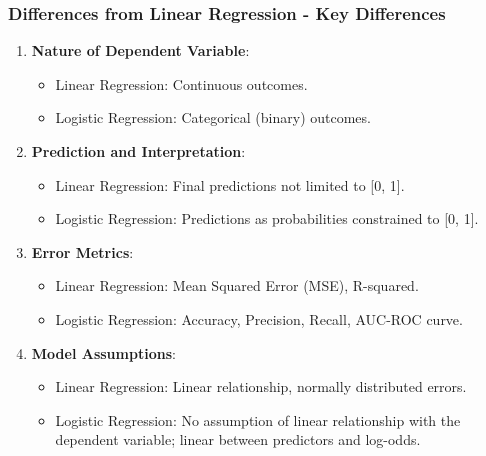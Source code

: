 \documentclass[aspectratio=169]{beamer}
\begin{document}
\begin{frame}[fragile]
    \frametitle{Differences from Linear Regression - Key Differences}
    
    \begin{enumerate}
        \item \textbf{Nature of Dependent Variable}:
            \begin{itemize}
                \item Linear Regression: Continuous outcomes.
                \item Logistic Regression: Categorical (binary) outcomes.
            \end{itemize}

        \item \textbf{Prediction and Interpretation}:
            \begin{itemize}
                \item Linear Regression: Final predictions not limited to [0, 1].
                \item Logistic Regression: Predictions as probabilities constrained to [0, 1].
            \end{itemize}

        \item \textbf{Error Metrics}:
            \begin{itemize}
                \item Linear Regression: Mean Squared Error (MSE), R-squared.
                \item Logistic Regression: Accuracy, Precision, Recall, AUC-ROC curve.
            \end{itemize}
    
        \item \textbf{Model Assumptions}:
            \begin{itemize}
                \item Linear Regression: Linear relationship, normally distributed errors.
                \item Logistic Regression: No assumption of linear relationship with the dependent variable; linear between predictors and log-odds.
            \end{itemize}
    \end{enumerate}
\end{frame}
\end{document}
